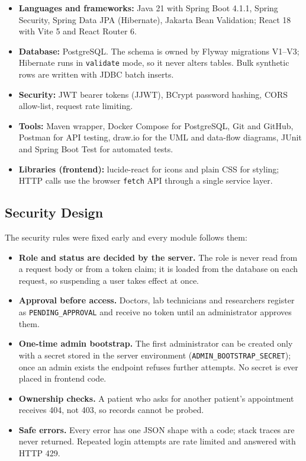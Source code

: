 \documentclass{tietreport}
\begin{document}
\begin{itemize}
  \item \textbf{Languages and frameworks:} Java 21 with Spring Boot 4.1.1,
    Spring Security, Spring Data JPA (Hibernate), Jakarta Bean Validation;
    React 18 with Vite 5 and React Router 6.
  \item \textbf{Database:} PostgreSQL. The schema is owned by Flyway
    migrations V1--V3; Hibernate runs in \texttt{validate} mode, so it never
    alters tables. Bulk synthetic rows are written with JDBC batch inserts.
  \item \textbf{Security:} JWT bearer tokens (JJWT), BCrypt password hashing,
    CORS allow-list, request rate limiting.
  \item \textbf{Tools:} Maven wrapper, Docker Compose for PostgreSQL, Git and
    GitHub, Postman for API testing, draw.io for the UML and data-flow
    diagrams, JUnit and Spring Boot Test for automated tests.
  \item \textbf{Libraries (frontend):} lucide-react for icons and plain CSS
    for styling; HTTP calls use the browser \texttt{fetch} API through a
    single service layer.
\end{itemize}

\subsection{Security Design}

The security rules were fixed early and every module follows them:

\begin{itemize}
  \item \textbf{Role and status are decided by the server.} The role is
    never read from a request body or from a token claim; it is loaded from
    the database on each request, so suspending a user takes effect at once.
  \item \textbf{Approval before access.} Doctors, lab technicians and
    researchers register as \texttt{PENDING\_APPROVAL} and receive no token
    until an administrator approves them.
  \item \textbf{One-time admin bootstrap.} The first administrator can be
    created only with a secret stored in the server environment
    (\texttt{ADMIN\_BOOTSTRAP\_SECRET}); once an admin exists the endpoint
    refuses further attempts. No secret is ever placed in frontend code.
  \item \textbf{Ownership checks.} A patient who asks for another patient's
    appointment receives 404, not 403, so records cannot be probed.
  \item \textbf{Safe errors.} Every error has one JSON shape with a code;
    stack traces are never returned. Repeated login attempts are rate
    limited and answered with HTTP 429.
\end{itemize}
\end{document}
